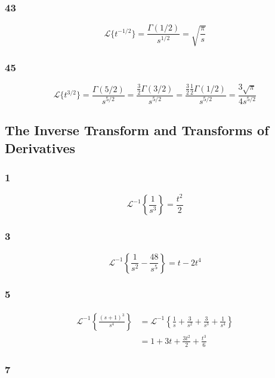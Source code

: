 \documentclass{article}
\begin{document}
\subsubsection{43}

\[\mathcal{L}\{t^{-1 / 2}\} = \frac{\Gamma (1 / 2)}{s^{1 / 2}} = \sqrt{\frac{\pi}{s}}\]

\subsubsection{45}

\[\mathcal{L}\{t^{3 / 2}\} = \frac{\Gamma (5 / 2)}{s^{5 / 2}} = \frac{\frac{3}{2} \Gamma (3 / 2)}{s^{5 / 2}} = \frac{\frac{3}{2} \frac{1}{2} \Gamma (1 / 2)}{s^{5 / 2}} = \frac{3 \sqrt{\pi}}{4 s^{5 / 2}}\]

\subsection{The Inverse Transform and Transforms of Derivatives}

\subsubsection{1}

\[\mathcal{L}^{-1} \left\{\frac{1}{s^3} \right\} = \frac{t^2}{2}\]

\subsubsection{3}

\[\mathcal{L}^{-1} \left\{ \frac{1}{s^2} - \frac{48}{s^5} \right\} = t - 2 t^4\]

\subsubsection{5}

\begin{align*}
  \mathcal{L}^{-1} \left\{ \frac{(s + 1)^3}{s^4} \right\} & = \mathcal{L}^{-1} \left\{ \frac{1}{s} + \frac{3}{s^2} + \frac{3}{s^3} + \frac{1}{s^4} \right\} \\
                                                          & = 1 + 3 t + \frac{3 t^2}{2} + \frac{t^3}{6}
\end{align*}

\subsubsection{7}
\end{document}
